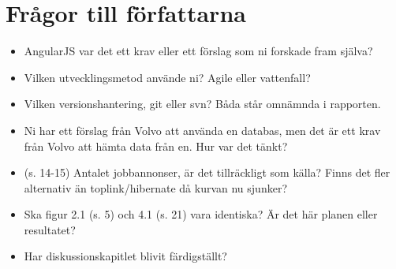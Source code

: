 \section{Frågor till författarna} %
\label{sec:fr_gor_till_f_rfattarna}

\begin{itemize}
    \item AngularJS var det ett krav eller ett förslag som ni forskade fram själva?
    \item Vilken utvecklingsmetod använde ni? Agile eller vattenfall?
    \item Vilken versionshantering, git eller svn? Båda står omnämnda i rapporten.
    \item Ni har ett förslag från Volvo att använda en databas, men det är ett krav från Volvo att hämta data från en. Hur var det tänkt?
    \item (s. 14-15) Antalet jobbannonser, är det tillräckligt som källa? Finns det fler alternativ än toplink/hibernate då kurvan nu sjunker?
    \item Ska figur 2.1 (s. 5) och 4.1 (s. 21) vara identiska?  Är det här planen eller resultatet?
    \item Har diskussionskapitlet blivit färdigställt?

\end{itemize}

